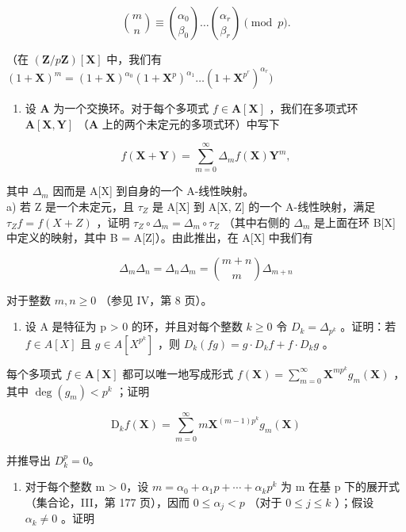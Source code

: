 \[
\binom {m} {n} \equiv \binom {\alpha_ {0}} {\beta_ {0}} \dots \binom {\alpha_ {r}} {\beta_ {r}} \pmod {p}  .
\]

（在 \((\mathbf{Z} / p\mathbf{Z})[\mathbf{X}]\) 中，我们有 \((1 + \mathbf{X})^m = (1 + \mathbf{X})^{\alpha_0}(1 + \mathbf{X}^p)^{\alpha_1}\dots (1 + \mathbf{X}^{p^r})^{\alpha_r})\)

\begin{enumerate}
\def\labelenumi{\arabic{enumi})}
\setcounter{enumi}{2}
\tightlist
\item
  设 \(\mathbf{A}\) 为一个交换环。对于每个多项式 \(f \in \mathbf{A}[\mathbf{X}]\) ，我们在多项式环 \(\mathbf{A}[\mathbf{X}, \mathbf{Y}]\) （\(\mathbf{A}\) 上的两个未定元的多项式环）中写下
\end{enumerate}

\[
f (\mathbf {X} + \mathbf {Y}) = \sum_ {m = 0} ^ {\infty} \Delta_ {m} f (\mathbf {X}) \mathbf {Y} ^ {m},
\]

其中 \(\Delta_{m}\) 因而是 A{[}X{]} 到自身的一个 A-线性映射。\\
a) 若 Z 是一个未定元，且 \(\tau_{Z}\) 是 A{[}X{]} 到 A{[}X, Z{]} 的一个 A-线性映射，满足 \(\tau_{Z}f = f(X + Z)\) ，证明 \(\tau_{Z} \circ \Delta_{m} = \Delta_{m} \circ \tau_{Z}\) （其中右侧的 \(\Delta_{m}\) 是上面在环 B{[}X{]} 中定义的映射，其中 B = A{[}Z{]}）。由此推出，在 A{[}X{]} 中我们有

\[
\Delta_ {m} \Delta_ {n} = \Delta_ {n} \Delta_ {m} = \binom {m + n} {m} \Delta_ {m + n}
\]

对于整数 \(m, n \geqslant 0\) （参见 IV，第 8 页）。

\begin{enumerate}
\def\labelenumi{\alph{enumi})}
\setcounter{enumi}{1}
\tightlist
\item
  设 A 是特征为 p \textgreater{} 0 的环，并且对每个整数 \(k \geqslant 0\) 令 \(D_{k} = \Delta_{p^{k}}\) 。证明：若 \(f \in A[X]\) 且 \(g \in A[X^{p^{k}}]\) ，则 \(D_{k}(fg) = g \cdot D_{k}f + f \cdot D_{k}g\) 。
\end{enumerate}

每个多项式 \(f \in \mathbf{A}[\mathbf{X}]\) 都可以唯一地写成形式 \(f(\mathbf{X}) = \sum_{m=0}^{\infty} \mathbf{X}^{mp^k} g_m(\mathbf{X})\) ，其中 \(\deg(g_m) < p^k\) ；证明

\[
\mathrm{D} _ {k} f (\mathbf {X}) = \sum_ {m = 0} ^ {\infty} m \mathbf {X} ^ {(m - 1) p ^ {k}} g _ {m} (\mathbf {X})
\]

并推导出 \(D_{k}^{p}=0\)。

\begin{enumerate}
\def\labelenumi{\alph{enumi})}
\setcounter{enumi}{2}
\tightlist
\item
  对于每个整数 m \textgreater{} 0，设 \(m = \alpha_{0} + \alpha_{1}p + \cdots + \alpha_{k}p^{k}\) 为 m 在基 p 下的展开式（集合论，III，第 177 页），因而 \(0 \leqslant \alpha_{j} < p\) （对于 \(0 \leqslant j \leqslant k\) ）；假设 \(\alpha_{k} \neq 0\) 。证明
\end{enumerate}

